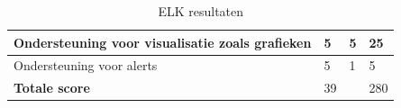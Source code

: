 \begin{table}[ht]
\begin{tabular}{| m{20em} | m{2cm} | m{2cm} | m{2cm} |}
        Ondersteuning voor visualisatie zoals grafieken                                                                   & 5                     & 5                   & 25                            \\ \hline
        Ondersteuning voor alerts                                                                                         & 5                     & 1                   & 5                             \\ \hline
        \textbf{Totale score}                                                                                             & 39                    &                     & 280                           \\ \hline
    \end{tabular}
    \caption{ELK resultaten}
    \label{tab:ELK-resultaten}
\end{table}


